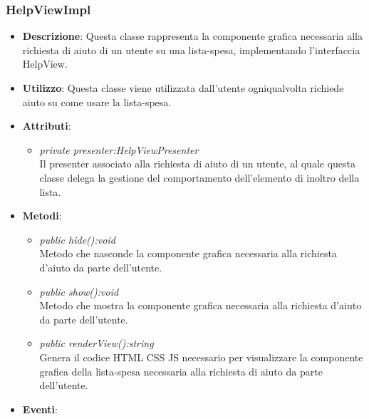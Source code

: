 \subsubsection{HelpViewImpl}
\begin{itemize}
\item \textbf{Descrizione}: Questa classe rappresenta la componente grafica necessaria alla richiesta di aiuto di un utente su una lista-spesa, implementando l'interfaccia HelpView.
\item \textbf{Utilizzo}: Questa classe viene utilizzata dall'utente ogniqualvolta richiede aiuto su come usare la lista-spesa.
\item \textbf{Attributi}:
\begin{itemize}
\item \textit{private presenter:HelpViewPresenter}\\
Il presenter associato alla richiesta di aiuto di un utente, al quale questa classe delega la gestione del comportamento dell'elemento di inoltro della lista.
\end{itemize}
\item \textbf{Metodi}:
	\begin{itemize}
	\item \textit{public hide():void}\\
	Metodo che nasconde la componente grafica necessaria alla richiesta d'aiuto da parte dell'utente.
	\item \textit{public show():void}\\
	Metodo che mostra la componente grafica necessaria alla richiesta d'aiuto da parte dell'utente.
	\item \textit{public renderView():string}\\
	Genera il codice HTML CSS JS necessario per visualizzare la componente grafica della lista-spesa necessaria alla richiesta di aiuto da parte dell'utente.
	\end{itemize}
\item \textbf{Eventi}:
\end{itemize}

